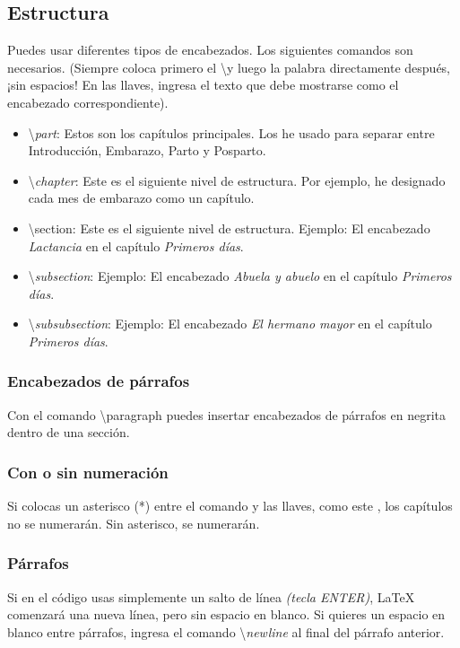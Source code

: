 \subsection{Estructura}
Puedes usar diferentes tipos de encabezados. Los siguientes comandos son necesarios. (Siempre coloca primero el \textbackslash y luego la palabra directamente después, ¡sin espacios! En las llaves, ingresa el texto que debe mostrarse como el encabezado correspondiente).
\begin{itemize}
    \item \textbackslash \textit{part}: Estos son los capítulos principales. Los he usado para separar entre Introducción, Embarazo, Parto y Posparto.
    \item \textbackslash \textit{chapter}: Este es el siguiente nivel de estructura. Por ejemplo, he designado cada mes de embarazo como un capítulo.
    \item \textbackslash se\textit{}ction: Este es el siguiente nivel de estructura. Ejemplo: El encabezado \emph{Lactancia} en el capítulo \emph{Primeros días}.
    \item \textbackslash \textit{subsection}: Ejemplo: El encabezado \emph{Abuela y abuelo} en el capítulo \emph{Primeros días}.
    \item \textbackslash \textit{subsubsection}: Ejemplo: El encabezado \emph{El hermano mayor} en el capítulo \emph{Primeros días}.
\end{itemize}

\subsubsection{Encabezados de párrafos}
Con el comando \textbackslash paragraph puedes insertar encabezados de párrafos en negrita dentro de una sección.

\subsubsection{Con o sin numeración}
Si colocas un asterisco (*) entre el comando y las llaves, como este \*, los capítulos no se numerarán. Sin asterisco, se numerarán.

\subsubsection{Párrafos}
Si en el código usas simplemente un salto de línea \textit{(tecla ENTER)}, \LaTeX{} comenzará una nueva línea, pero sin espacio en blanco. Si quieres un espacio en blanco entre párrafos, ingresa el comando \textbackslash \textit{newline} al final del párrafo anterior.

